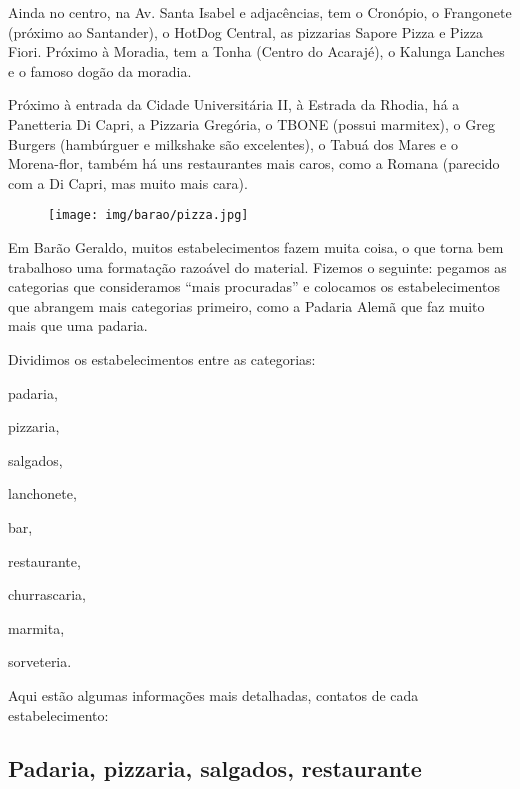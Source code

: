 Ainda no centro, na Av. Santa Isabel e adjacências, tem o Cronópio, o
Frangonete (próximo ao Santander), o HotDog Central, as pizzarias Sapore Pizza
e Pizza Fiori. Próximo à Moradia, tem a Tonha (Centro do Acarajé), o Kalunga
Lanches e o famoso dogão da moradia.

Próximo à entrada da Cidade Universitária II, à Estrada da Rhodia, há a
Panetteria Di Capri, a Pizzaria Gregória, o TBONE (possui marmitex), o Greg
Burgers (hambúrguer e milkshake são excelentes), o Tabuá dos Mares e o
Morena-flor, também há uns restaurantes mais caros, como a Romana (parecido com
a Di Capri, mas muito mais cara).\\

\begin{figure}[h!]
    \centering
    \texttt{[image: img/barao/pizza.jpg]}
\end{figure}

Em Barão Geraldo, muitos estabelecimentos fazem muita coisa, o que torna bem
trabalhoso uma formatação razoável do material. Fizemos o seguinte: pegamos as
categorias que consideramos ``mais procuradas'' e colocamos os estabelecimentos
que abrangem mais categorias primeiro, como a Padaria Alemã que faz muito mais
que uma padaria.

Dividimos os estabelecimentos entre as categorias:

\begin{itemize}[noitemsep]
\begin{multicols}{2}
\item padaria,
\item pizzaria,
\item salgados,
\item lanchonete,
\item bar,
\item restaurante,
\item churrascaria,
\item marmita,
\item sorveteria.
\end{multicols}
\end{itemize}

Aqui estão algumas informações mais detalhadas, contatos de cada
estabelecimento:

\subsection{Padaria, pizzaria, salgados, restaurante}

